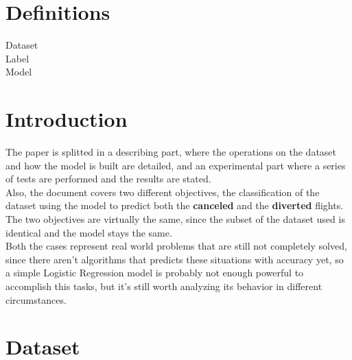 \documentclass[
	letterpaper, %
	10pt, %
]{class}
\begin{document}
\section{Definitions}\label{definitions} %

\begin{description}
  \item[Dataset]
  \item[Label]
  \item[Model]
  \item[]
\end{description}


\section{Introduction}

The paper is splitted in a describing part, where the operations on the dataset and how the model is built are detailed, and an experimental part where a series of tests are performed and the results are stated.\\

Also, the document covers two different objectives, the classification of the dataset using the model to predict both the \textbf{canceled} and the \textbf{diverted} flights.\\
The two objectives are virtually the same, since the subset of the dataset used is identical and the model stays the same.\\

Both the cases represent real world problems that are still not completely solved, since there aren't algorithms that predicts these situations with accuracy yet, so a simple Logistic Regression model is probably not enough powerful to accomplish this tasks, but it's still worth analyzing its behavior in different circumstances.


\section{Dataset}
\end{document}
